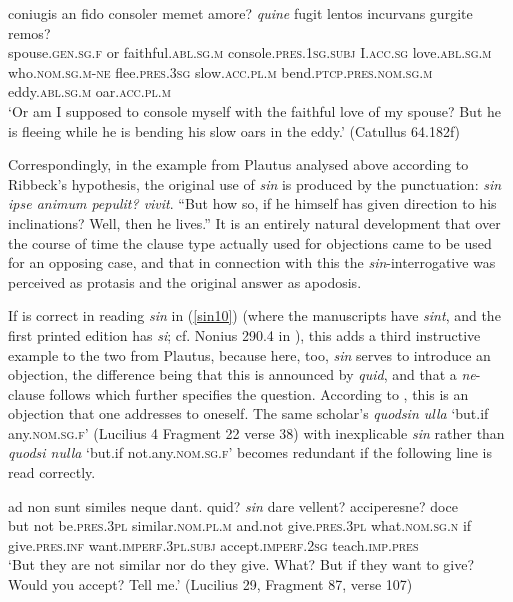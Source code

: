 \begin{exe}
\ex
\gll coniugis an fido consoler memet amore? \emph{quine} fugit lentos incurvans gurgite remos?\\
spouse.\textsc{gen.sg.f} or faithful.\textsc{abl.sg.m} console.\textsc{pres.1sg.subj} I.\textsc{acc.sg} love.\textsc{abl.sg.m} who.\textsc{nom.sg.m}-\textsc{ne} flee.\textsc{pres.3sg} slow.\textsc{acc.pl.m} bend.\textsc{ptcp.pres.nom.sg.m} eddy.\textsc{abl.sg.m} oar.\textsc{acc.pl.m}\\
\trans `Or am I supposed to console myself with the faithful love of my spouse? But he is fleeing while he is bending his slow oars in the eddy.' (Catullus 64.182f) 
\label{ne13x}
\end{exe}

Correspondingly, in the example from Plautus analysed above according to Ribbeck's \citeyearpar{Ribbeck1869} hypothesis, the original use of \emph{sin} is produced by the punctuation: \emph{sin ipse animum pepulit? vivit}. ``But how so, if he himself has given direction to his inclinations? Well, then he lives.'' It is an entirely natural development that over the course of time the clause type actually used for objections came to be used for an opposing case, and that in connection with this the \emph{sin}-interrogative was perceived as protasis and the original answer as apodosis.

If \citet[210]{Mueller1872} is correct in reading \emph{sin} in (\ref{sin10}) (where the manuscripts have \emph{sint}, and the first printed edition has \emph{si}; cf. Nonius 290.4 in \citealp[456]{Mueller1888}), this adds a third instructive example to the two from Plautus, because here, too, \emph{sin} serves to introduce an objection, the difference being that this is announced by \emph{quid}, and that a \emph{ne}-clause follows which further specifies the question. According to \citet{Mueller1872}, this is an objection that one addresses to oneself. The same scholar's \emph{quodsin ulla} `but.if any.\textsc{nom.sg.f}' (Lucilius 4 Fragment 22 verse 38) with inexplicable \emph{sin} rather than \emph{quodsi nulla} `but.if not.any.\textsc{nom.sg.f}' becomes redundant if the following line is read correctly.

\begin{exe}
\ex
\gll ad non sunt similes neque dant. quid? \emph{sin} dare vellent? acciperesne? doce\\
but not be.\textsc{pres.3pl} similar.\textsc{nom.pl.m} and.not give.\textsc{pres.3pl} what.\textsc{nom.sg.n} if give.\textsc{pres.inf} want.\textsc{imperf.3pl.subj} accept.\textsc{imperf.2sg} teach.\textsc{imp.pres}\\
\trans `But they are not similar nor do they give. What? But if they want to give? Would you accept? Tell me.' (Lucilius 29, Fragment 87, verse 107) 
\label{sin10}
\end{exe}

